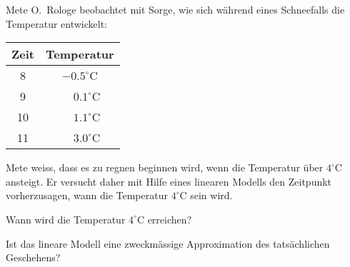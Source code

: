 Mete O.~Rologe beobachtet mit Sorge, wie sich während eines Schneefalls
die Temperatur entwickelt:
\begin{center}
\begin{tabular}{|c|c|}
\hline
Zeit&Temperatur\\
\hline
\phantom{0}8&$-0.5^\circ \text{C}$\\
\phantom{0}9&$\phantom{-}0.1^\circ \text{C}$\\ 
10&$\phantom{-}1.1^\circ \text{C}$\\
11&$\phantom{-}3.0^\circ \text{C}$\\
\hline
\end{tabular}
\end{center}
Mete weiss, dass es zu regnen beginnen wird, wenn die Temperatur über
$4^\circ\text{C}$ ansteigt.
Er versucht daher mit Hilfe eines linearen Modells den Zeitpunkt 
vorherzusagen, wann die Temperatur $4^\circ \text{C}$ sein wird.
\begin{teilaufgaben}
\item
Wann wird die Temperatur $4^\circ \text{C}$ erreichen?
\item
Ist das lineare Modell eine zweckmässige Approximation des tatsächlichen
Geschehens?
\end{teilaufgaben}


